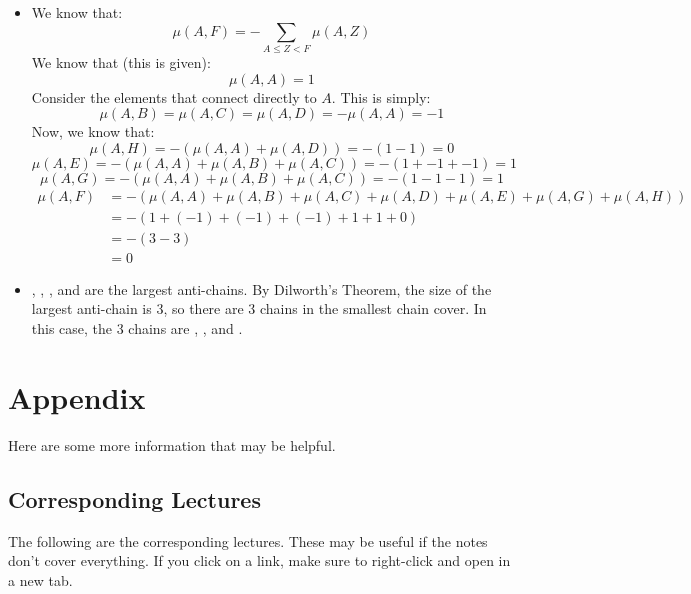 \documentclass[letterpaper]{article}
\begin{document}
\begin{itemize}
    \item We know that:
    \[\mu(A, F) = -\sum_{A \leq Z < F} \mu(A, Z)\]
    We know that (this is given):
    \[\mu(A, A) = 1\]
    Consider the elements that connect directly to $A$. This is simply: 
    \[\mu(A, B) = \mu(A, C) = \mu(A, D) = -\mu(A, A) = -1\]
    Now, we know that:
    \[\mu(A, H) = -(\mu(A, A) + \mu(A, D)) = -(1 - 1) = 0\]
    \[\mu(A, E) = -(\mu(A, A) + \mu(A, B) + \mu(A, C)) = -(1 + -1 + -1) = 1\]
    \[\mu(A, G) = -(\mu(A, A) + \mu(A, B) + \mu(A, C)) = -(1 - 1 - 1) = 1\]
    \begin{equation*}
        \begin{aligned}
            \mu(A, F) &= -(\mu(A, A) + \mu(A, B) + \mu(A, C) + \mu(A, D) + \mu(A, E) + \mu(A, G) + \mu(A, H)) \\ 
                &= -(1 + (-1) + (-1) + (-1) + 1 + 1 + 0) \\ 
                &= -(3 - 3) \\ 
                &= 0
        \end{aligned}
    \end{equation*}
    \item {}, , , and  are the largest anti-chains. By Dilworth's Theorem, the size of the largest anti-chain is 3, so there are 3 chains in the smallest chain cover. In this case, the 3 chains are , , and . 
\end{itemize}







\newpage 
\section{Appendix}
Here are some more information that may be helpful.

\subsection{Corresponding Lectures}
The following are the corresponding lectures. These may be useful if the notes don't cover everything. If you click on a link, make sure to right-click and open in a new tab. 
\end{document}
